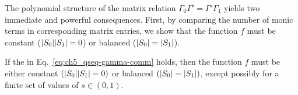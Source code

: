 The polynomial structure of the matrix relation $\Gamma_0\Gamma' = \Gamma'\Gamma_1$ yields two immediate and powerful consequences.
First, by comparing the number of monic terms in corresponding matrix entries, we show that the function $f$ must be constant ($\abs{S_0}\abs{S_1}=0$) or balanced ($\abs{S_0} = \abs{S_1}$).

\begin{theorem}\label{thm:ch5_qseq-balanced}
    If the \gammacomm{} in Eq.~\eqref{eq:ch5_qseq-gamma-comm} holds, then the function $f$ must be either constant $(\abs{S_0}\abs{S_1} = 0)$ or balanced $(\abs{S_0} = \abs{S_1})$, except possibly for a finite set of values of $s \in (0,1)$.
\end{theorem}

